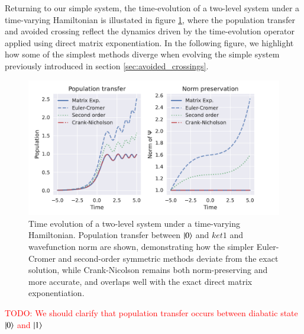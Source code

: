 \documentclass{subfiles}
\begin{document}
Returning to our simple system, the time-evolution of a two-level system under a time-varying Hamiltonian is illustated in figure \ref{fig:landau_zener}, where the population transfer and avoided crossing reflect the dynamics driven by the time-evolution operator applied using direct matrix exponentiation. In the following figure, we highlight how some of the simplest methods diverge when evolving the simple system previously introduced in section \ref{sec:avoided_crossings}.
\begin{figure}[h!]
    \centering
    \includegraphics[width=1.0\textwidth]{figs/landau_zener_numerical_methods.pdf}
    \caption{Time evolution of a two-level system under a time-varying Hamiltonian. Population transfer between $\ket{0}$ and $ket{1}$ and wavefunction norm are shown, demonstrating how the simpler Euler-Cromer and second-order symmetric methods deviate from the exact solution, while Crank-Nicolson remains both norm-preserving and more accurate, and overlaps well with the exact direct matrix exponentiation.}\label{fig:landau_zener}
\end{figure}
\textcolor{red}{TODO: We should clarify that population transfer occurs between diabatic state $\ket{0}$ and $ \ket{1}$}
\end{document}

